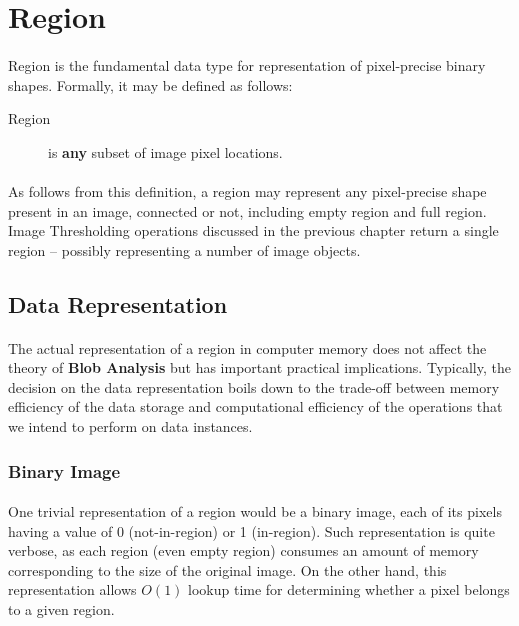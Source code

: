 
\section{Region}

\paragraph*{}
Region is the fundamental data type for representation of pixel-precise binary shapes. Formally, it may be defined as follows:

\begin{description}
	\item[Region] is \textbf{any} subset of image pixel locations.
\end{description}

\paragraph*{}
As follows from this definition, a region may represent any pixel-precise shape present in an image, connected or not, including empty region and full region. Image Thresholding operations discussed in the previous chapter return a single region -- possibly representing a number of image objects.

\subsection{Data Representation}

\paragraph*{}
The actual representation of a region in computer memory does not affect the theory of \textbf{Blob Analysis} but has important practical implications. Typically, the decision on the data representation boils down to  the trade-off between memory efficiency of the data storage and computational efficiency of the operations that we intend to perform on data instances.

\subsubsection{Binary Image}

\paragraph*{}
One trivial representation of a region would be a binary image, each of its pixels having a value of 0 (not-in-region) or 1 (in-region). Such representation is quite verbose, as each region (even empty region) consumes an amount of memory corresponding to the size of the original image. On the other hand, this representation allows $O(1)$ lookup time for determining whether a pixel belongs to a given region.

